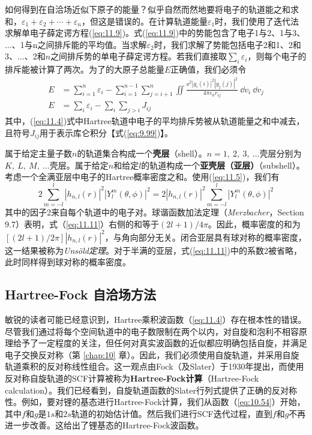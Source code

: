     如何得到在自洽场近似下原子的能量？似乎自然而然地要将电子的轨道能之和求和，$\varepsilon_1 + \varepsilon_2 + \cdots + \varepsilon_n$，但这是错误的。在计算轨道能量$\varepsilon_1$时，我们使用了迭代法求解单电子薛定谔方程(\ref{eq:11.9})。式(\ref{eq:11.9})中的势能包含了电子1与2、1与3、$\ldots$、1与n之间排斥能的平均值。当求解$\varepsilon_2$时，我们求解了势能包括电子2和1、2和3、$\ldots$、2和$n$之间排斥势的单电子薛定谔方程。若我们直接取$\sum_i \varepsilon_i$，则每个电子的排斥能被计算了两次。为了的大原子总能量$E$正确值，我们必须令
    \begin{align}
        E &= \sum_{i=1}^{n} \varepsilon_{i} - \sum_{i=1}^{n-1} \sum_{j=i+1}^{n} \iint \frac{\ee ^{2} |g_{i}(i)|^{2} |g_{j}(j)|^{2}}{4 \pi \varepsilon_{0} r_{i j}} \:\dd v_{i} \:\dd v_{j} \label{eq:11.10} \\
        E &= \sum_{i} \varepsilon_{i} - \sum_{i} \sum_{j>i} J_{ij} \nonumber
    \end{align}
    其中，(\ref{eq:11.4})式中Hartree轨道中电子的平均排斥势被从轨道能量之和中减去，且符号$J_{ij}$用于表示库仑积分【式(\ref{eq:9.99})】。

    属于给定主量子数$n$的轨道集合构成一个\textbf{壳层}（shell）。$n = 1, \: 2, \: 3, \: \ldots$壳层分别为$K, \: L, \: M, \: \ldots$壳层。属于给定$n$和给定$l$的轨道构成一个\textbf{亚壳层（亚层）}（subshell）。考虑一个全满亚层中电子的Hartree概率密度之和。使用(\ref{eq:11.5})，我们有
    \begin{equation}
        2 \sum_{m=-l}^{l} \left|h_{n,l}(r)\right|^2 \left|Y_l^m(\theta, \phi)\right|^2 = 2\left|h_{n,l}(r)\right|^2 \sum_{m=-l}^{l} \left|Y_l^m(\theta, \phi)\right|^2
        \label{eq:11.11}
    \end{equation}
    其中的因子2来自每个轨道中的电子对。球谐函数加法定理（\textit{Merzbacher}，Section 9.7）表明，式（\ref{eq:11.11}）右侧的和等于$\left(2l + 1\right) / 4\pi$。因此，概率密度的和为$\left[\left(2l + 1\right) / 2\pi\right]\left|h_{n,l}(r)\right|^2$，与角向部分无关。闭合亚层具有球对称的概率密度，这一结果被称为\textit{Unsöld定理}。对于半满的亚层，式(\ref{eq:11.11})中的系数2被省略，此时同样得到球对称的概率密度。

\subsection*{Hartree-Fock 自洽场方法}

    敏锐的读者可能已经意识到，Hartree乘积波函数（\ref{eq:11.4}）存在根本性的错误。尽管我们通过将每个空间轨道中的电子数限制在两个以内，对自旋和泡利不相容原理给予了一定程度的关注，但任何对真实波函数的近似都应明确包括自旋，并满足电子交换反对称（第 \ref{chap:10} 章）。因此，我们必须使用自旋轨道，并采用自旋轨道乘积的反对称线性组合。这一观点由Fock（及Slater）于1930年提出，而使用反对称自旋轨道的SCF计算被称为\textbf{Hartree-Fock计算}（Hartree-Fock calculation）。我们已经看到，自旋轨道函数的Slater行列式提供了正确的反对称性。例如，要对锂的基态进行Hartree-Fock计算，我们从函数（\ref{eq:10.54}）开始，其中$f$和$g$是$1s$和$2s$轨道的初始估计值。然后我们进行SCF迭代过程，直到$f$和$g$不再进一步改善。这给出了锂基态的Hartree-Fock波函数。

